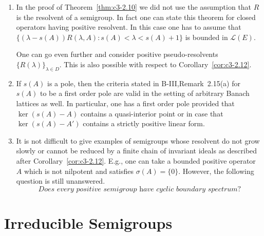 \begin{remarks}\label{rem:c3-2.15}
\begin{enumerate}	
	\item 
	In the proof of Theorem~\ref{thm:c3-2.10} we did not use the assumption that $R$ is the resolvent of a semigroup.
	In fact one can state this theorem for closed operators having positive resolvent.
	In this case one has to assume that $\{(\lambda-s(A))R(\lambda,A) : s(A) < \lambda < s(A)+1\}$ is bounded in $\mathcal{L}(E)$.
	
	One can go even further and consider positive pseudo-resolvents $\{R(\lambda)\}_{\lambda\in D}$.
	This is also possible with respect to Corollary~\ref{cor:c3-2.12}.
	
	\item 
	If $s(A)$ is a pole, then the criteria stated in B-III,Remark~2.15(a) for $s(A)$ to be a first order pole are valid in the setting of arbitrary Banach lattices as well.
	In particular, one has a first order pole provided that $\ker(s(A) - A)$ contains a quasi-interior point or in case that $\ker(s(A) - A')$ contains a strictly positive linear form.
	
	\item 
	It is not difficult to give examples of semigroups whose resolvent do not grow slowly or cannot be reduced by a finite chain of invariant ideals as described after Corollary~\ref{cor:c3-2.12}.
	E.g., one can take a bounded positive operator $A$ which is not nilpotent and satisfies $\sigma(A) = \{0\}$.
	However, the following question is still unanswered.
	\begin{equation*}
		\textit{Does every positive semigroup have cyclic boundary spectrum?}
	\end{equation*}
\end{enumerate}
\end{remarks}
%
%
\section{Irreducible Semigroups}\label{sec:c3-3}

